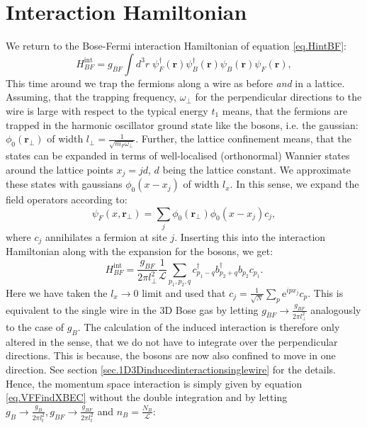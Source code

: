 \section{Interaction Hamiltonian} \label{sec.interaction.lattice}
We return to the Bose-Fermi interaction Hamiltonian of equation \eqref{eq.HintBF}:
\begin{equation}
H_{BF}^\text{int} = g_{BF}\int d^3 r \; \psi_F^\dagger(\mathbf{r}) \psi_B^\dagger(\mathbf{r})\psi_B(\mathbf{r})\psi_F(\mathbf{r}),
\end{equation} 
This time around we trap the fermions along a wire as before \textit{and} in a lattice. Assuming, that the trapping frequency, $\omega_{\perp}$ for the perpendicular directions to the wire is large with respect to the typical energy $t_1$ means, that the fermions are trapped in the harmonic oscillator ground state like the bosons, i.e. the gaussian: $\phi_0(\mathbf{r}_{\perp})$ of width $l_{\perp} = \frac{1}{\sqrt{m_F\omega_{\perp}}}$. Further, the lattice confinement means, that the states can be expanded in terms of well-localised (orthonormal) Wannier states around the lattice points $x_j = jd$, $d$ being the lattice constant. We approximate these states with gaussians $\phi_0(x - x_j)$ of width $l_x$. In this sense, we expand the field operators according to:
\begin{equation}
\psi_F(x, \mathbf{r}_{\perp}) = \sum_j \phi_0(\mathbf{r}_{\perp})\phi_0(x - x_j) c_j, 
\end{equation}
where $c_j$ annihilates a fermion at site $j$. Inserting this into the interaction Hamiltonian along with the expansion for the bosons, we get:
\begin{equation}
H_{BF}^{\text{int}} = \frac{g_{BF}}{2\pi l_{\perp}^2}\frac{1}{\mathcal{L}}\sum_{p_1, p_2, q} c^\dagger_{p_1 - q}b^\dagger_{p_2 + q}b_{p_2}c_{p_1}. \nonumber
\end{equation}
Here we have taken the $l_x \to 0$ limit and used that $c_j = \frac{1}{\sqrt{N}}\sum_p \text{e}^{ipx_j}c_p$. This is equivalent to the single wire in the 3D Bose gas by letting $g_{BF} \to \frac{g_{BF}}{2\pi l_{\perp}^2}$ analogously to the case of $g_B$. The calculation of the induced interaction is therefore only altered in the sense, that we do not have to integrate over the perpendicular directions. This is because, the bosons are now also confined to move in one direction. See section \ref{sec.1D3Dinducedinteractionsinglewire} for the details. Hence, the momentum space interaction is simply given by equation \eqref{eq.VFFindXBEC} without the double integration and by letting $g_B \to \frac{g_B}{2\pi l_t^2}, g_{BF} \to \frac{g_{BF}}{2\pi l_t^2}$ and $n_B = \frac{N_B}{\mathcal{L}}$:
